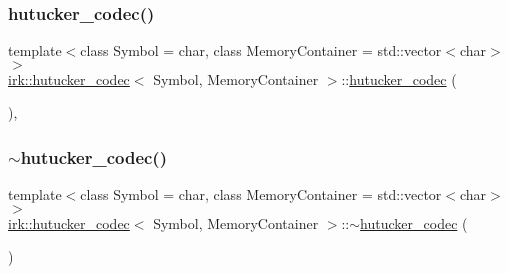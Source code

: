 \mbox{\label{classirk_1_1hutucker__codec_a352279b1fadd10bf1cb6e5424cc7e340}} 
\subsubsection{\texorpdfstring{hutucker\+\_\+codec()}{hutucker\_codec()}\hspace{0.1cm}{\footnotesize\ttfamily [2/4]}}
{\footnotesize\ttfamily template$<$class Symbol = char, class Memory\+Container = std\+::vector$<$char$>$$>$ \\
\mbox{\hyperlink{classirk_1_1hutucker__codec}{irk\+::hutucker\+\_\+codec}}$<$ Symbol, Memory\+Container $>$\+::\mbox{\hyperlink{classirk_1_1hutucker__codec}{hutucker\+\_\+codec}} (\begin{DoxyParamCaption}\item[{\mbox{\hyperlink{classirk_1_1hutucker__codec}{hutucker\+\_\+codec}}$<$ Symbol, Memory\+Container $>$ \&\&}]{ }\end{DoxyParamCaption})\hspace{0.3cm}{\ttfamily [default]}, {\ttfamily [noexcept]}}

\mbox{\label{classirk_1_1hutucker__codec_ae028bba786a7f242d0ef617ec87fb581}} 
\subsubsection{\texorpdfstring{$\sim$hutucker\+\_\+codec()}{~hutucker\_codec()}}
{\footnotesize\ttfamily template$<$class Symbol = char, class Memory\+Container = std\+::vector$<$char$>$$>$ \\
\mbox{\hyperlink{classirk_1_1hutucker__codec}{irk\+::hutucker\+\_\+codec}}$<$ Symbol, Memory\+Container $>$\+::$\sim$\mbox{\hyperlink{classirk_1_1hutucker__codec}{hutucker\+\_\+codec}} (\begin{DoxyParamCaption}{ }\end{DoxyParamCaption})\hspace{0.3cm}{\ttfamily [default]}}

